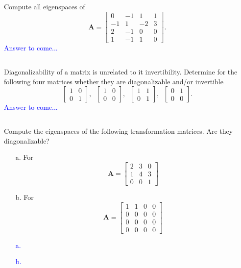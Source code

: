 \documentclass[a4paper,12pt]{article}
\newcommand{\M}[1]{ \begin{bmatrix} #1 \end{bmatrix} }
\newcommand{\matA}{\textbf{A}}
\begin{document}
\subsection{}
Compute all eigenspaces of
$$\matA = \M{0&-1&1&1\\
                       -1&1&-2&3\\
                       2&-1&0&0\\
                       1&-1&1&0}.$$
\textcolor{blue}{
Answer to come...
}
\subsection{}
Diagonalizability of a matrix is unrelated to it invertibility. Determine for the following four matrices whether they are diagonalizable and/or invertible
$$\M{1&0\\0&1}, \;\; \M{1&0\\0&0}, \;\; \M{1&1\\0&1}, \;\; \M{0&1\\0&0}.$$
\textcolor{blue}{
Answer to come...
}
\subsection{}
Compute the eigenspaces of the following transformation matrices. Are they diagonalizable?
\begin{itemize}
 \item [a.] For $$\matA = \M{2&3&0\\1&4&3\\0&0&1}$$
 \item [b.] For $$\matA = \M{1&1&0&0\\0&0&0&0\\0&0&0&0\\0&0&0&0}$$
\end{itemize}
\textcolor{blue}{
\begin{itemize}
 \item [a.]
 \item [b.]
\end{itemize}
}
\end{document}

